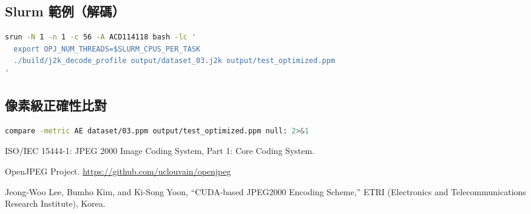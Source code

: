 \documentclass[UTF8,a4paper,12pt]{ctexart}
\begin{document}
\subsection{Slurm 範例（解碼）}
\begin{lstlisting}[language=bash]
srun -N 1 -n 1 -c 56 -A ACD114118 bash -lc '
  export OPJ_NUM_THREADS=$SLURM_CPUS_PER_TASK
  ./build/j2k_decode_profile output/dataset_03.j2k output/test_optimized.ppm
'
\end{lstlisting}

\subsection{像素級正確性比對}
\begin{lstlisting}[language=bash]
compare -metric AE dataset/03.ppm output/test_optimized.ppm null: 2>&1
\end{lstlisting}

\begin{thebibliography}{9}
ISO/IEC 15444-1: JPEG 2000 Image Coding System, Part 1: Core Coding System.

OpenJPEG Project. \url{https://github.com/uclouvain/openjpeg}

Jeong-Woo Lee, Bumho Kim, and Ki-Song Yoon, ``CUDA-based JPEG2000 Encoding Scheme,'' ETRI (Electronics and Telecommunications Research Institute), Korea.
\end{thebibliography}
\end{document}

